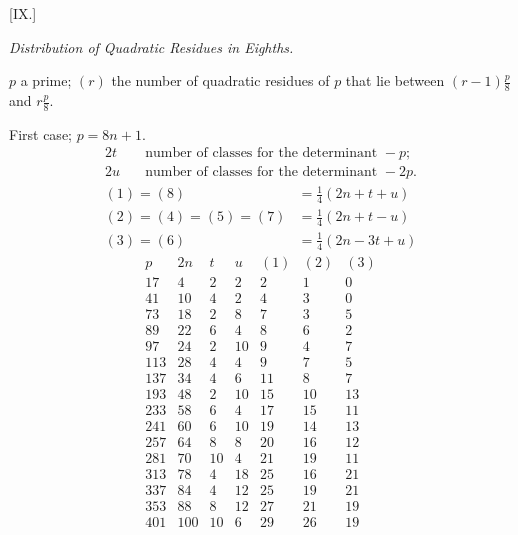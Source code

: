 \clearpage
{}
\par\bigskip{}\centerline{[IX.]}\medskip
\begin{center}\emph{Distribution of Quadratic Residues in Eighths.}\end{center}
$p$ a prime; $(r)$ the number of quadratic residues of $p$ that lie between $(r-1)\frac p8$ and $r\frac p8$.

First case; $p=8n+1$.
\[
\begin{aligned}
2t&\quad\text{number of classes for the determinant }-p;\\
2u&\quad\text{number of classes for the determinant }-2p.
\end{aligned}
\]
\[
\begin{aligned}
(1)=(8)&=\tfrac14(2n+t+u)\\
(2)=(4)=(5)=(7)&=\tfrac14(2n+t-u)\\
(3)=(6)&=\tfrac14(2n-3t+u)
\end{aligned}
\]
\[
\begin{array}{r|r|r|r|r|r|r}
p&2n&t&u&(1)&(2)&(3)\\\hline
17&4&2&2&2&1&0\\
41&10&4&2&4&3&0\\
73&18&2&8&7&3&5\\
89&22&6&4&8&6&2\\
97&24&2&10&9&4&7\\
113&28&4&4&9&7&5\\
137&34&4&6&11&8&7\\
193&48&2&10&15&10&13\\
233&58&6&4&17&15&11\\
241&60&6&10&19&14&13\\
257&64&8&8&20&16&12\\
281&70&10&4&21&19&11\\
313&78&4&18&25&16&21\\
337&84&4&12&25&19&21\\
353&88&8&12&27&21&19\\
401&100&10&6&29&26&19
\end{array}
\]

